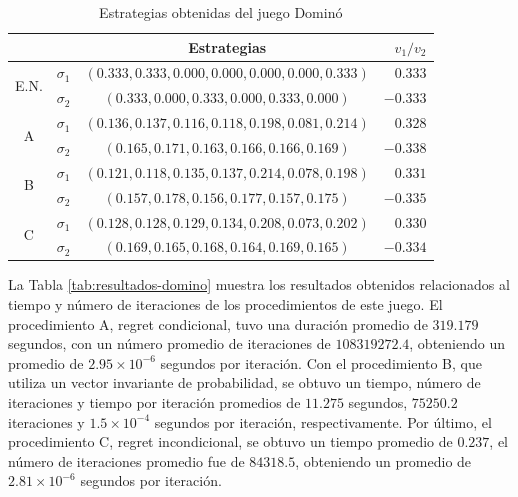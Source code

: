 \begin{table}[ht]
    \centering
    \begin{tabular}{c c|c|r}
        & & Estrategias & $v_1 / v_2$\\
        \hline
        \multirow{2}{*}{E.N.}
        & $\sigma_1$ & $(0.333, 0.333, 0.000, 0.000, 0.000, 0.000, 0.333)$ & $0.333$ \\
        & $\sigma_2$ & $(0.333, 0.000, 0.333, 0.000, 0.333, 0.000)$ &  $-0.333$\\
        \hline
        \multirow{2}{*}{A}
        & $\sigma_1$ & $(0.136, 0.137, 0.116, 0.118, 0.198, 0.081, 0.214)$ & $0.328$ \\
        & $\sigma_2$ & $(0.165, 0.171, 0.163, 0.166, 0.166, 0.169)$ & $-0.338$\\
        \hline
        \multirow{2}{*}{B}
        & $\sigma_1$ & $(0.121, 0.118, 0.135, 0.137, 0.214, 0.078, 0.198)$ & $0.331$ \\
        & $\sigma_2$ & $(0.157, 0.178, 0.156, 0.177, 0.157, 0.175)$ & $-0.335$\\
        \hline
        \multirow{2}{*}{C}
        & $\sigma_1$ & $(0.128, 0.128, 0.129, 0.134, 0.208, 0.073, 0.202)$ & $0.330$ \\
        & $\sigma_2$ & $(0.169, 0.165, 0.168, 0.164, 0.169, 0.165)$ & $-0.334$\\
        \hline
    \end{tabular}
    \caption{Estrategias obtenidas del juego Dominó}
    \label{tab:estrategias-domino}
\end{table}

La Tabla \ref{tab:resultados-domino} muestra los resultados obtenidos relacionados al tiempo y número de iteraciones de los procedimientos de este juego. El procedimiento A, regret condicional, tuvo una duración promedio de $319.179$ segundos, con un número promedio de iteraciones de $108319272.4$, obteniendo un promedio de $2.95 {\times} 10^{-6}$ segundos por iteración. Con el procedimiento B, que utiliza un vector invariante de probabilidad, se obtuvo un tiempo, número de iteraciones y tiempo por iteración promedios de $11.275$ segundos, $75250.2$ iteraciones y $1.5 {\times} 10^{-4}$ segundos por iteración, respectivamente. Por último, el procedimiento C, regret incondicional, se obtuvo un tiempo promedio de $0.237$, el número de iteraciones promedio fue de $84318.5$, obteniendo un promedio de $2.81 {\times} 10^{-6}$ segundos por iteración. 

